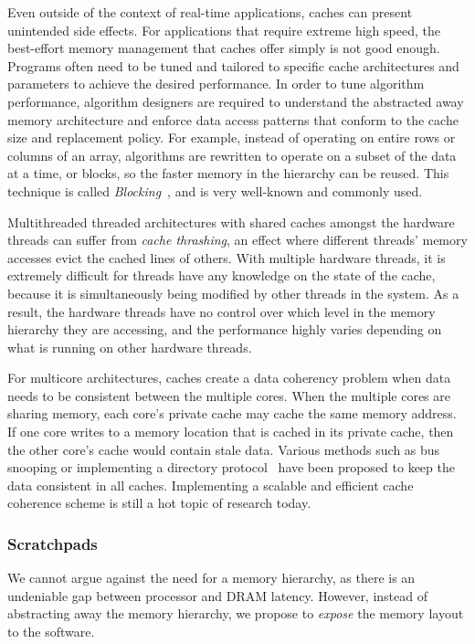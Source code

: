 Even outside of the context of real-time applications, caches can present unintended side effects.
For applications that require extreme high speed, the best-effort memory management that caches offer simply is not good enough.
Programs often need to be tuned and tailored to specific cache architectures and parameters to achieve the desired performance. 
In order to tune algorithm performance, algorithm designers are required to understand the abstracted away memory architecture and enforce data access patterns that conform to the cache size and replacement policy.   
For example, instead of operating on entire rows or columns of an array, algorithms are rewritten to operate on a subset of the data at a time, or blocks, so the faster memory in the hierarchy can be reused.
This technique is called \emph{Blocking}~\cite{Lam91thecache}, and is very well-known and commonly used.   

Multithreaded threaded architectures with shared caches amongst the hardware threads can suffer from \emph{cache thrashing}, an effect where different threads' memory accesses evict the cached lines of others.
With multiple hardware threads, it is extremely difficult for threads have any knowledge on the state of the cache, because it is simultaneously being modified by other threads in the system. 
As a result, the hardware threads have no control over which level in the memory hierarchy they are accessing, and the performance highly varies depending on what is running on other hardware threads. 

For multicore architectures, caches create a data coherency problem when data needs to be consistent between the multiple cores.
When the multiple cores are sharing memory, each core's private cache may cache the same memory address. 
If one core writes to a memory location that is cached in its private cache, then the other core's cache would contain stale data. 
Various methods such as bus snooping or implementing a directory protocol~\cite{Stenstrom:1990:SCC:79809.79810} have been proposed to keep the data consistent in all caches. 
Implementing a scalable and efficient cache coherence scheme is still a hot topic of research today.

\subsubsection{Scratchpads}
We cannot argue against the need for a memory hierarchy, as there is an undeniable gap between processor and DRAM latency.
However, instead of abstracting away the memory hierarchy, we propose to \emph{expose} the memory layout to the software.  

